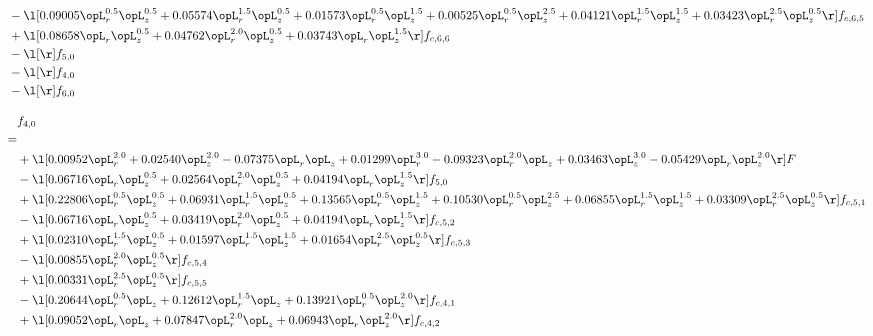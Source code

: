 \begin{alignat}{2}
& - \l[  0.09005 \opL_r^{0.5} \opL_z^{0.5} +  0.05574 \opL_r^{1.5} \opL_z^{0.5} +  0.01573 \opL_r^{0.5} \opL_z^{1.5} +  0.00525 \opL_r^{0.5} \opL_z^{2.5} +  0.04121 \opL_r^{1.5} \opL_z^{1.5} +  0.03423 \opL_r^{2.5} \opL_z^{0.5}  \r] f_{c,6,5} \nonumber \\ 
& + \l[  0.08658 \opL_r \opL_z^{0.5} +  0.04762 \opL_r^{2.0} \opL_z^{0.5} +  0.03743 \opL_r \opL_z^{1.5}  \r] f_{c,6,6} \nonumber \\ 
& - \l[  \r] f_{5,0} \nonumber \\ 
& - \l[  \r] f_{4,0} \nonumber \\ 
& - \l[  \r] f_{6,0} \nonumber \\ 
\end{alignat} 


\begin{alignat}{2} 
\label{eq:f_40_2} 
& f_{4,0} \nonumber \\ 
 = \\ 
& + \l[  0.00952 \opL_r^{2.0} +  0.02540 \opL_z^{2.0}   -0.07375 \opL_r \opL_z +  0.01299 \opL_r^{3.0}   -0.09323 \opL_r^{2.0} \opL_z +  0.03463 \opL_z^{3.0}   -0.05429 \opL_r \opL_z^{2.0}  \r] F \nonumber \\ 
& - \l[  0.06716 \opL_r \opL_z^{0.5} +  0.02564 \opL_r^{2.0} \opL_z^{0.5} +  0.04194 \opL_r \opL_z^{1.5}  \r] f_{5,0} \nonumber \\ 
& + \l[  0.22806 \opL_r^{0.5} \opL_z^{0.5} +  0.06931 \opL_r^{1.5} \opL_z^{0.5} +  0.13565 \opL_r^{0.5} \opL_z^{1.5} +  0.10530 \opL_r^{0.5} \opL_z^{2.5} +  0.06855 \opL_r^{1.5} \opL_z^{1.5} +  0.03309 \opL_r^{2.5} \opL_z^{0.5}  \r] f_{c,5,1} \nonumber \\ 
& - \l[  0.06716 \opL_r \opL_z^{0.5} +  0.03419 \opL_r^{2.0} \opL_z^{0.5} +  0.04194 \opL_r \opL_z^{1.5}  \r] f_{c,5,2} \nonumber \\ 
& + \l[  0.02310 \opL_r^{1.5} \opL_z^{0.5} +  0.01597 \opL_r^{1.5} \opL_z^{1.5} +  0.01654 \opL_r^{2.5} \opL_z^{0.5}  \r] f_{c,5,3} \nonumber \\ 
& - \l[  0.00855 \opL_r^{2.0} \opL_z^{0.5}  \r] f_{c,5,4} \nonumber \\ 
& + \l[  0.00331 \opL_r^{2.5} \opL_z^{0.5}  \r] f_{c,5,5} \nonumber \\ 
& - \l[  0.20644 \opL_r^{0.5} \opL_z +  0.12612 \opL_r^{1.5} \opL_z +  0.13921 \opL_r^{0.5} \opL_z^{2.0}  \r] f_{c,4,1} \nonumber \\ 
& + \l[  0.09052 \opL_r \opL_z +  0.07847 \opL_r^{2.0} \opL_z +  0.06943 \opL_r \opL_z^{2.0}  \r] f_{c,4,2} \nonumber \\ 

\end{alignat}
